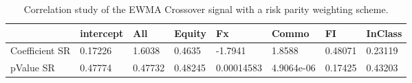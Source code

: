 \begin{table}[H]
\centering
\begin{tabular}{llllllll}
& intercept & All & Equity & Fx & Commo & FI & InClass \\ 
\hline 
Coefficient SR & 0.17226 & 1.6038 & 0.4635 & -1.7941 & 1.8588 & 0.48071 & 0.23119 \\ 
pValue SR & 0.47774 & 0.47732 & 0.48245 & 0.00014583 & 4.9064e-06 & 0.17425 & 0.43203 \\ 
\hline
\end{tabular}
\caption{Correlation study of the EWMA Crossover signal with a risk parity weighting scheme.}
\label{MBBS2__RP_CORR}
\end{table}